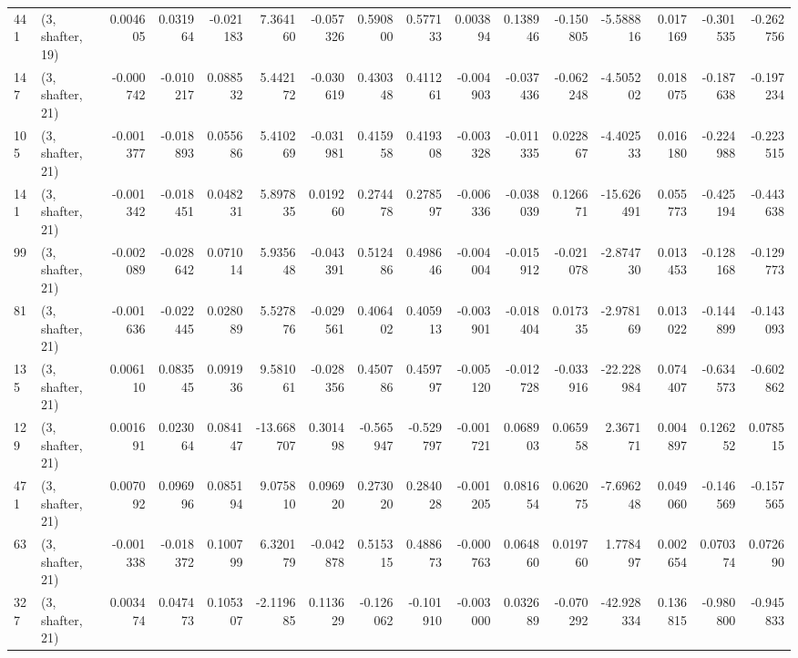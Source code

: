 \begin{tabular}{llrrrrrrrrrrrrrr}
441 &  (3, shafter, 19) &   0.004605 &  0.031964 & -0.021183 &    7.364160 & -0.057326 &   0.590800 &   0.577133 &  0.003894 &  0.138946 & -0.150805 &   -5.588816 &  0.017169 &  -0.301535 &  -0.262756 \\
147 &  (3, shafter, 21) &  -0.000742 & -0.010217 &  0.088532 &    5.442172 & -0.030619 &   0.430348 &   0.411261 & -0.004903 & -0.037436 & -0.062248 &   -4.505202 &  0.018075 &  -0.187638 &  -0.197234 \\
105 &  (3, shafter, 21) &  -0.001377 & -0.018893 &  0.055686 &    5.410269 & -0.031981 &   0.415958 &   0.419308 & -0.003328 & -0.011335 &  0.022867 &   -4.402533 &  0.016180 &  -0.224988 &  -0.223515 \\
141 &  (3, shafter, 21) &  -0.001342 & -0.018451 &  0.048231 &    5.897835 &  0.019260 &   0.274478 &   0.278597 & -0.006336 & -0.038039 &  0.126671 &  -15.626491 &  0.055773 &  -0.425194 &  -0.443638 \\
99  &  (3, shafter, 21) &  -0.002089 & -0.028642 &  0.071014 &    5.935648 & -0.043391 &   0.512486 &   0.498646 & -0.004004 & -0.015912 & -0.021078 &   -2.874730 &  0.013453 &  -0.128168 &  -0.129773 \\
81  &  (3, shafter, 21) &  -0.001636 & -0.022445 &  0.028089 &    5.527876 & -0.029561 &   0.406402 &   0.405913 & -0.003901 & -0.018404 &  0.017335 &   -2.978169 &  0.013022 &  -0.144899 &  -0.143093 \\
135 &  (3, shafter, 21) &   0.006110 &  0.083545 &  0.091936 &    9.581061 & -0.028356 &   0.450786 &   0.459797 & -0.005120 & -0.012728 & -0.033916 &  -22.228984 &  0.074407 &  -0.634573 &  -0.602862 \\
129 &  (3, shafter, 21) &   0.001691 &  0.023064 &  0.084147 &  -13.668707 &  0.301498 &  -0.565947 &  -0.529797 & -0.001721 &  0.068903 &  0.065958 &    2.367171 &  0.004897 &   0.126252 &   0.078515 \\
471 &  (3, shafter, 21) &   0.007092 &  0.096996 &  0.085194 &    9.075810 &  0.096920 &   0.273020 &   0.284028 & -0.001205 &  0.081654 &  0.062075 &   -7.696248 &  0.049060 &  -0.146569 &  -0.157565 \\
63  &  (3, shafter, 21) &  -0.001338 & -0.018372 &  0.100799 &    6.320179 & -0.042878 &   0.515315 &   0.488673 & -0.000763 &  0.064860 &  0.019760 &    1.778497 &  0.002654 &   0.070374 &   0.072690 \\
327 &  (3, shafter, 21) &   0.003474 &  0.047473 &  0.105307 &   -2.119685 &  0.113629 &  -0.126062 &  -0.101910 & -0.003000 &  0.032689 & -0.070292 &  -42.928334 &  0.136815 &  -0.980800 &  -0.945833 \\

\end{tabular}
